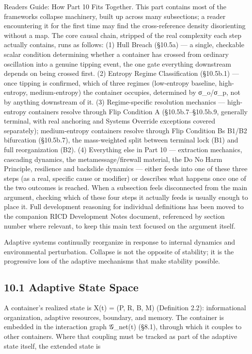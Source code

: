 \documentclass[
]{article}
\begin{document}
Readers Guide: How Part 10 Fits Together. This part contains most of the
frameworks collapse machinery, built up across many subsections; a
reader encountering it for the first time may find the cross-reference
density disorienting without a map. The core causal chain, stripped of
the real complexity each step actually contains, runs as follows: (1)
Hull Breach (§10.5a) --- a single, checkable scalar condition
determining whether a container has crossed from ordinary oscillation
into a genuine tipping event, the one gate everything downstream depends
on being crossed first. (2) Entropy Regime Classification (§10.5b.1) ---
once tipping is confirmed, which of three regimes (low-entropy baseline,
high-entropy, medium-entropy) the container occupies, determined by
σ\_o/σ\_p, not by anything downstream of it. (3) Regime-specific
resolution mechanics --- high-entropy containers resolve through Flip
Condition A (§10.5b.7--§10.5b.9, generally terminal, with real anchoring
and Systems Override exceptions covered separately); medium-entropy
containers resolve through Flip Condition Bs B1/B2 bifurcation
(§10.5b.7), the mass-weighted split between terminal lock (B1) and full
reorganization (B2). (4) Everything else in Part 10 --- extraction
mechanics, cascading dynamics, the metamessage/firewall material, the Do
No Harm Principle, resilience and backslide dynamics --- either feeds
into one of these three steps (as a real, specific cause or modifier) or
describes what happens once one of the two outcomes is reached. When a
subsection feels disconnected from the main argument, checking which of
these four steps it actually feeds is usually enough to place it. Full
development reasoning for individual definitions has been moved to the
companion RICD Development Notes document, referenced by section number
where relevant, to keep this main text focused on the argument itself.

Adaptive systems continually reorganize in response to internal dynamics
and environmental perturbation. Collapse is not the opposite of
stability; it is the progressive loss of the adaptive mechanisms that
make stability possible.

\hypertarget{adaptive-state-space}{%
\subsection{10.1 Adaptive State Space}\label{adaptive-state-space}}

A container's realized state is X(t) = (P, R, B, M) (Definition 2.2):
informational organization, adaptive resources, boundary, and memory.
The container is embedded in the interaction graph 𝒢\_net(t) (§8.1),
through which it couples to other containers. Where that coupling must
be tracked as part of the adaptive state itself, the extended state is
\end{document}
